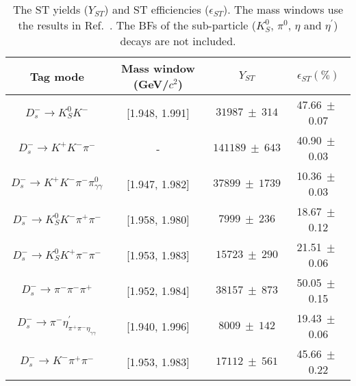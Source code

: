 \begin{table}[htbp]
    \caption{ The ST yields ($Y_{ST}$) and ST efficiencies ($\epsilon_{ST}$). 
    The mass windows use the results in Ref.~\cite{Doc-DB-630-v35}. 
The BFs of the sub-particle ($K_{S}^{0}$, $\pi^{0}$, $\eta$ and $\eta^{'}$) decays are not included.}
    \label{ST-eff}
    \begin{center}
        \begin{tabular}{cccc}
            \toprule\toprule
            Tag mode & Mass window (GeV/$c^{2}$)  & $Y_{ST}$  & $\epsilon_{ST}(\%)$\\
            \hline
            $D_{s}^{-} \rightarrow K_{S}^{0}K^{-}$                          & [1.948, 1.991]    & $31987\ \pm\ 314$               & 47.66$\ \pm\ $0.07\\
            $D_{s}^{-} \rightarrow K^{+}K^{-}\pi^{-}$                       & -                 & $141189\ \pm\ 643$              & 40.90$\ \pm\ $0.03\\
            $D_{s}^{-} \rightarrow K^{+}K^{-}\pi^{-}\pi^{0}_{\gamma\gamma}$                & [1.947, 1.982]    & $37899\ \pm\ 1739$              & 10.36$\ \pm\ $0.03\\
            $D_{s}^{-} \rightarrow K_{S}^{0}K^{-}\pi^{+}\pi^{-}$            & [1.958, 1.980]    & $7999\ \pm\ 236$               & 18.67$\ \pm\ $0.12\\
            $D_{s}^{-} \rightarrow K_{S}^{0}K^{+}\pi^{-}\pi^{-}$            & [1.953, 1.983]    & $15723\ \pm\ 290$               & 21.51$\ \pm\ $0.06\\
            $D_{s}^{-} \rightarrow \pi^{-}\pi^{-}\pi^{+}$                   & [1.952, 1.984]    & $38157\ \pm\ 873$              & 50.05$\ \pm\ $0.15\\
            $D_{s}^{-} \rightarrow \pi^{-}\eta_{\pi^{+}\pi^{-}\eta_{\gamma\gamma}}^{'}$          & [1.940, 1.996]    & $8009\ \pm\ 142$               & 19.43$\ \pm\ $0.06\\
            $D_{s}^{-} \rightarrow K^{-}\pi^{+}\pi^{-}$                     & [1.953, 1.983]    & $17112\ \pm\ 561$               & 45.66$\ \pm\ $0.22\\
            \bottomrule\bottomrule
        \end{tabular}
    \end{center}
\end{table}

